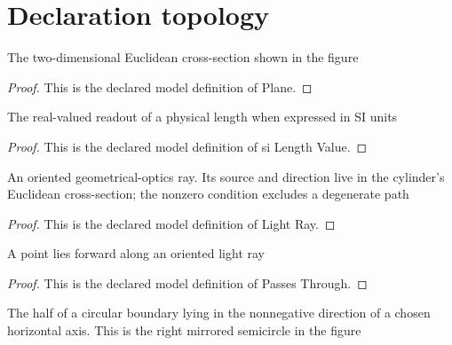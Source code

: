 \section{Declaration topology}
\begin{definition}[Plane]
  \label{def:physics:phyx-mini-0020:phyxminiproblems-problemphyxmini0020-plane}
  The two-dimensional Euclidean cross-section shown in the figure
\end{definition}
\begin{proof}
  This is the declared model definition of Plane.
\end{proof}
\begin{definition}
  \label{def:physics:phyx-mini-0020:phyxminiproblems-problemphyxmini0020-silengthvalue}
  The real-valued readout of a physical length when expressed in SI units
\end{definition}
\begin{proof}
  This is the declared model definition of si Length Value.
\end{proof}
\begin{definition}
  \label{def:physics:phyx-mini-0020:phyxminiproblems-problemphyxmini0020-lightray}
  An oriented geometrical-optics ray. Its source and direction live in the cylinder's Euclidean cross-section; the nonzero condition excludes a degenerate path
\end{definition}
\begin{proof}
  This is the declared model definition of Light Ray.
\end{proof}
\begin{definition}
  \label{def:physics:phyx-mini-0020:phyxminiproblems-problemphyxmini0020-lightray-passesthrough}
  A point lies forward along an oriented light ray
\end{definition}
\begin{proof}
  This is the declared model definition of Passes Through.
\end{proof}
\begin{definition}
  \label{def:physics:phyx-mini-0020:phyxminiproblems-problemphyxmini0020-rightsemicircle}
  The half of a circular boundary lying in the nonnegative direction of a chosen horizontal axis. This is the right mirrored semicircle in the figure
\end{definition}
